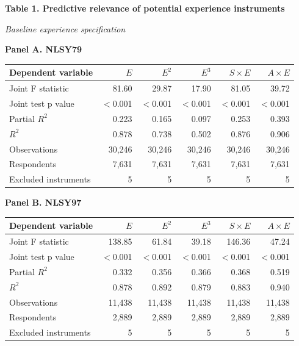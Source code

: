 \begin{center}
{\large\bfseries Table 1. Predictive relevance of potential experience instruments}\par
\smallskip
\textit{Baseline experience specification}\par
\medskip
\end{center}
\small
\noindent\textbf{Panel A. NLSY79}\par\smallskip
\noindent\begin{tabular*}{\textwidth}{@{\extracolsep{\fill}}lrrrrr@{}}
\toprule
Dependent variable & $E$ & $E^2$ & $E^3$ & $S\times E$ & $A\times E$ \\
\midrule
Joint F statistic & 81.60 & 29.87 & 17.90 & 81.05 & 39.72 \\
Joint test p value & $<$0.001 & $<$0.001 & $<$0.001 & $<$0.001 & $<$0.001 \\
Partial $R^2$ & 0.223 & 0.165 & 0.097 & 0.253 & 0.393 \\
$R^2$ & 0.878 & 0.738 & 0.502 & 0.876 & 0.906 \\
Observations & 30,246 & 30,246 & 30,246 & 30,246 & 30,246 \\
Respondents & 7,631 & 7,631 & 7,631 & 7,631 & 7,631 \\
Excluded instruments & 5 & 5 & 5 & 5 & 5 \\
\bottomrule
\end{tabular*}\par\smallskip
\medskip
\noindent\textbf{Panel B. NLSY97}\par\smallskip
\noindent\begin{tabular*}{\textwidth}{@{\extracolsep{\fill}}lrrrrr@{}}
\toprule
Dependent variable & $E$ & $E^2$ & $E^3$ & $S\times E$ & $A\times E$ \\
\midrule
Joint F statistic & 138.85 & 61.84 & 39.18 & 146.36 & 47.24 \\
Joint test p value & $<$0.001 & $<$0.001 & $<$0.001 & $<$0.001 & $<$0.001 \\
Partial $R^2$ & 0.332 & 0.356 & 0.366 & 0.368 & 0.519 \\
$R^2$ & 0.878 & 0.892 & 0.879 & 0.883 & 0.940 \\
Observations & 11,438 & 11,438 & 11,438 & 11,438 & 11,438 \\
Respondents & 2,889 & 2,889 & 2,889 & 2,889 & 2,889 \\
Excluded instruments & 5 & 5 & 5 & 5 & 5 \\
\bottomrule
\end{tabular*}\par\smallskip
